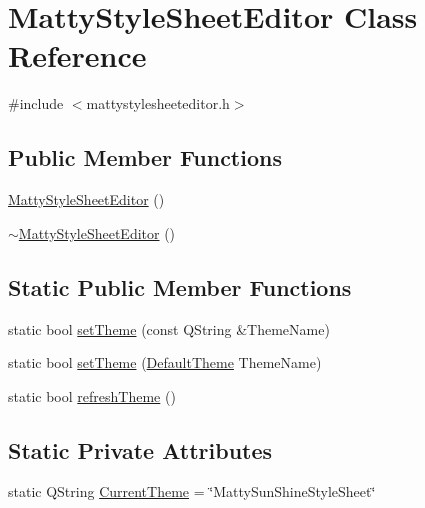 \hypertarget{classMattyStyleSheetEditor}{}\section{Matty\+Style\+Sheet\+Editor Class Reference}
\label{classMattyStyleSheetEditor}


{\ttfamily \#include $<$mattystylesheeteditor.\+h$>$}

\subsection*{Public Member Functions}
\begin{DoxyCompactItemize}
\item 
\hyperlink{classMattyStyleSheetEditor_ad99a6c56d91fcc24dc8e36bfbe34eda9}{Matty\+Style\+Sheet\+Editor} ()
\item 
\hyperlink{classMattyStyleSheetEditor_a53d519a70068544b30fb38db6eaf86a4}{$\sim$\+Matty\+Style\+Sheet\+Editor} ()
\end{DoxyCompactItemize}
\subsection*{Static Public Member Functions}
\begin{DoxyCompactItemize}
\item 
static bool \hyperlink{classMattyStyleSheetEditor_aec3ccdf356aab4c3156562465e779498}{set\+Theme} (const Q\+String \&Theme\+Name)
\item 
static bool \hyperlink{classMattyStyleSheetEditor_aea0577b5a1a832ae46f9ad8c4fbe79e2}{set\+Theme} (\hyperlink{mattystylesheeteditor_8h_ad58d92f62ffa3431951b8423c85d841d}{Default\+Theme} Theme\+Name)
\item 
static bool \hyperlink{classMattyStyleSheetEditor_a203c6d82e1fa8bbbf61d30de4191fc01}{refresh\+Theme} ()
\end{DoxyCompactItemize}
\subsection*{Static Private Attributes}
\begin{DoxyCompactItemize}
\item 
static Q\+String \hyperlink{classMattyStyleSheetEditor_afcf37fdaf80bc841551e62245c1e0343}{Current\+Theme} = \char`\"{}Matty\+Sun\+Shine\+Style\+Sheet\char`\"{}
\end{DoxyCompactItemize}


